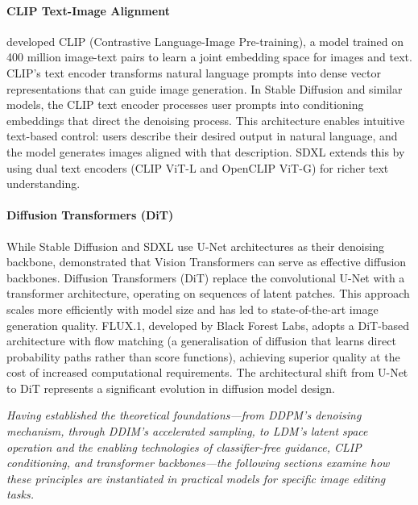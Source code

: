 \documentclass[12pt,a4paper]{report}
\begin{document}
\paragraph{CLIP Text-Image Alignment}

\citet{radford2021clip} developed CLIP (Contrastive Language-Image Pre-training), a model trained on 400 million image-text pairs to learn a joint embedding space for images and text. CLIP's text encoder transforms natural language prompts into dense vector representations that can guide image generation. In Stable Diffusion and similar models, the CLIP text encoder processes user prompts into conditioning embeddings that direct the denoising process. This architecture enables intuitive text-based control: users describe their desired output in natural language, and the model generates images aligned with that description. SDXL extends this by using dual text encoders (CLIP ViT-L and OpenCLIP ViT-G) for richer text understanding.

\paragraph{Diffusion Transformers (DiT)}

While Stable Diffusion and SDXL use U-Net architectures as their denoising backbone, \citet{peebles2023dit} demonstrated that Vision Transformers can serve as effective diffusion backbones. Diffusion Transformers (DiT) replace the convolutional U-Net with a transformer architecture, operating on sequences of latent patches. This approach scales more efficiently with model size and has led to state-of-the-art image generation quality. FLUX.1, developed by Black Forest Labs, adopts a DiT-based architecture with flow matching (a generalisation of diffusion that learns direct probability paths rather than score functions), achieving superior quality at the cost of increased computational requirements. The architectural shift from U-Net to DiT represents a significant evolution in diffusion model design.

\vspace{1em}
\noindent\textit{Having established the theoretical foundations---from DDPM's denoising mechanism, through DDIM's accelerated sampling, to LDM's latent space operation and the enabling technologies of classifier-free guidance, CLIP conditioning, and transformer backbones---the following sections examine how these principles are instantiated in practical models for specific image editing tasks.}
\end{document}
